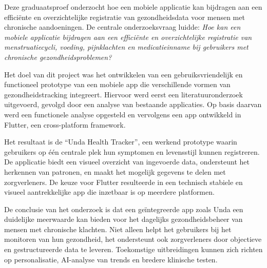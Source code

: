 Deze graduaatsproef onderzocht hoe een mobiele applicatie kan bijdragen aan een efficiënte en overzichtelijke registratie van gezondheidsdata voor mensen met chronische aandoeningen. De centrale onderzoeksvraag luidde: \textit{Hoe kan een mobiele applicatie bijdragen aan een efficiënte en overzichtelijke registratie van menstruatiecycli, voeding, pijnklachten en medicatieinname bij gebruikers met chronische gezondheidsproblemen?}

Het doel van dit project was het ontwikkelen van een gebruiksvriendelijk en functioneel prototype van een mobiele app die verschillende vormen van gezondheidstracking integreert. Hiervoor werd eerst een literatuuronderzoek uitgevoerd, gevolgd door een analyse van bestaande applicaties. Op basis daarvan werd een functionele analyse opgesteld en vervolgens een app ontwikkeld in Flutter, een cross-platform framework.

Het resultaat is de “Unda Health Tracker”, een werkend prototype waarin gebruikers op één centrale plek hun symptomen en levensstijl kunnen registreren. De applicatie biedt een visueel overzicht van ingevoerde data, ondersteunt het herkennen van patronen, en maakt het mogelijk gegevens te delen met zorgverleners. De keuze voor Flutter resulteerde in een technisch stabiele en visueel aantrekkelijke app die inzetbaar is op meerdere platformen.

De conclusie van het onderzoek is dat een geïntegreerde app zoals Unda een duidelijke meerwaarde kan bieden voor het dagelijks gezondheidsbeheer van mensen met chronische klachten. Niet alleen helpt het gebruikers bij het monitoren van hun gezondheid, het ondersteunt ook zorgverleners door objectieve en gestructureerde data te leveren. Toekomstige uitbreidingen kunnen zich richten op personalisatie, AI-analyse van trends en bredere klinische testen.


